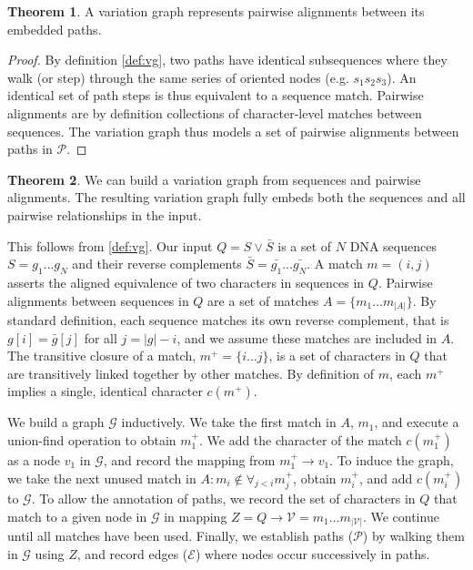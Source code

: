 \documentclass{bioinfo}
\theoremstyle{definition}
\newtheorem{theorem}{Theorem}[section]
\begin{document}
\begin{theorem}
A variation graph represents pairwise alignments between its embedded paths.
\end{theorem}

\begin{proof}
By definition \ref{def:vg}, two paths have identical subsequences where they walk (or step) through the same series of oriented nodes (e.g. $s_1 s_2 s_3$).
An identical set of path steps is thus equivalent to a sequence match.
Pairwise alignments are by definition collections of character-level matches between sequences.
The variation graph thus models a set of pairwise alignments between paths in $\mathcal{P}$.
\end{proof}

\begin{theorem}
\label{thm:seqwish}
We can build a variation graph from sequences and pairwise alignments.
The resulting variation graph fully embeds both the sequences and all pairwise relationships in the input.
\end{theorem}

This follows from \ref{def:vg}.
Our input $Q = S \vee \bar{S}$ is a set of $N$ DNA sequences $S = g_1 \ldots g_N$ and their reverse complements $\bar{S} = \bar{g_1} \ldots \bar{g_N}$.
A match $m = (i, j)$ asserts the aligned equivalence of two characters in sequences in $Q$.
Pairwise alignments between sequences in $Q$ are a set of matches $A = \{ m_1 \ldots m_{|A|} \}$.
By standard definition, each sequence matches its own reverse complement, that is $g[i] = \bar{g}[j]$ for all $j = |g| - i$, and we assume these matches are included in $A$.
The transitive closure of a match, $m^+ = \{ i \ldots j \}$, is a set of characters in $Q$ that are transitively linked together by other matches.
By definition of $m$, each $m^+$ implies a single, identical character $c(m^+)$.

We build a graph $\mathcal{G}$ inductively.
We take the first match in $A$, $m_1$, and execute a union-find operation to obtain $m_1^+$.
We add the character of the match $c(m_1^+)$ as a node $v_1$ in $\mathcal{G}$, and record the mapping from $m_1^+ \to v_1$.
To induce the graph, we take the next unused match in $A : m_i \notin \forall_{j < i} m_j^+$, obtain $m_i^+$, and add $c(m_i^+)$ to $\mathcal{G}$.
To allow the annotation of paths, we record the set of characters in $Q$ that match to a given node in $\mathcal{G}$ in mapping $Z = Q \to \mathcal{V} = m_1 \ldots m_{|\mathcal{V}|}$.
We continue until all matches have been used.
Finally, we establish paths ($\mathcal{P}$) by walking them in $\mathcal{G}$ using $Z$, and record edges ($\mathcal{E}$) where nodes occur successively in paths.
\end{document}
